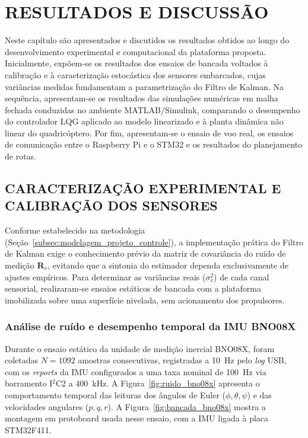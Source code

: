 \chapter{RESULTADOS E DISCUSSÃO}\label{cap:resultados}

Neste capítulo são apresentados e discutidos os resultados obtidos ao longo do desenvolvimento experimental e computacional da plataforma proposta. Inicialmente, expõem-se os resultados dos ensaios de bancada voltados à calibração e à caracterização estocástica dos sensores embarcados, cujas variâncias medidas fundamentam a parametrização do Filtro de Kalman. Na sequência, apresentam-se os resultados das simulações numéricas em malha fechada conduzidas no ambiente MATLAB/Simulink, comparando o desempenho do controlador LQG aplicado ao modelo linearizado e à planta dinâmica não linear do quadricóptero. Por fim, apresentam-se o ensaio de voo real, os ensaios de comunicação entre o Raspberry Pi e o STM32 e os resultados do planejamento de rotas.

\section{CARACTERIZAÇÃO EXPERIMENTAL E CALIBRAÇÃO DOS SENSORES}\label{sec:res_sensores}

Conforme estabelecido na metodologia (Seção~\ref{subsec:modelagem_projeto_controle}), a implementação prática do Filtro de Kalman exige o conhecimento prévio da matriz de covariância do ruído de medição $\mathbf{R}_v$, evitando que a sintonia do estimador dependa exclusivamente de ajustes empíricos. Para determinar as variâncias reais ($\sigma_v^2$) de cada canal sensorial, realizaram-se ensaios estáticos de bancada com a plataforma imobilizada sobre uma superfície nivelada, sem acionamento dos propulsores.

\subsection{Análise de ruído e desempenho temporal da IMU BNO08X}\label{subsec:res_bno08x}

Durante o ensaio estático da unidade de medição inercial BNO08X, foram coletadas $N = 1092$ amostras consecutivas, registradas a 10~Hz pelo \textit{log} USB, com os \textit{reports} da IMU configurados a uma taxa nominal de 100~Hz via barramento I$^2$C2 a 400~kHz. A Figura~\ref{fig:ruido_bno08x} apresenta o comportamento temporal das leituras dos ângulos de Euler ($\phi, \theta, \psi$) e das velocidades angulares ($p, q, r$). A Figura~\ref{fig:bancada_bno08x} mostra a montagem em protoboard usada nesse ensaio, com a IMU ligada à placa STM32F411.

